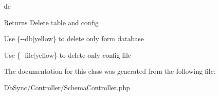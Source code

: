 de

\begin{DoxyReturn}{Returns}
Delete table and config 

Use \{-\/-\/db$|$yellow\} to delete only form database 

Use \{-\/-\/file$|$yellow\} to delete only config file 
\end{DoxyReturn}


The documentation for this class was generated from the following file:\begin{DoxyCompactItemize}
\item 
DbSync/Controller/SchemaController.php\end{DoxyCompactItemize}
